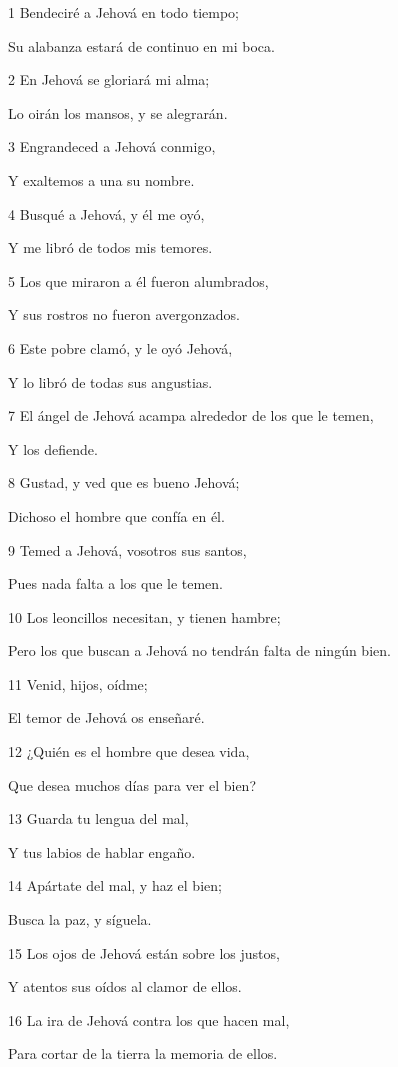 \par 1 Bendeciré a Jehová en todo tiempo;
\par Su alabanza estará de continuo en mi boca.
\par 2 En Jehová se gloriará mi alma;
\par Lo oirán los mansos, y se alegrarán.
\par 3 Engrandeced a Jehová conmigo,
\par Y exaltemos a una su nombre.
\par 4 Busqué a Jehová, y él me oyó,
\par Y me libró de todos mis temores.
\par 5 Los que miraron a él fueron alumbrados,
\par Y sus rostros no fueron avergonzados.
\par 6 Este pobre clamó, y le oyó Jehová,
\par Y lo libró de todas sus angustias.
\par 7 El ángel de Jehová acampa alrededor de los que le temen,
\par Y los defiende.
\par 8 Gustad, y ved que es bueno Jehová;
\par Dichoso el hombre que confía en él.
\par 9 Temed a Jehová, vosotros sus santos,
\par Pues nada falta a los que le temen.
\par 10 Los leoncillos necesitan, y tienen hambre;
\par Pero los que buscan a Jehová no tendrán falta de ningún bien.
\par 11 Venid, hijos, oídme;
\par El temor de Jehová os enseñaré.
\par 12 ¿Quién es el hombre que desea vida,
\par Que desea muchos días para ver el bien?
\par 13 Guarda tu lengua del mal,
\par Y tus labios de hablar engaño.
\par 14 Apártate del mal, y haz el bien;
\par Busca la paz, y síguela.
\par 15 Los ojos de Jehová están sobre los justos,
\par Y atentos sus oídos al clamor de ellos.
\par 16 La ira de Jehová contra los que hacen mal,
\par Para cortar de la tierra la memoria de ellos.
